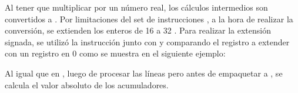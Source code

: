 \vspace{5mm}
\begin{center}
\end{center}

Al tener que multiplicar por un número real, los cálculos intermedios son convertidos a . Por limitaciones del set de instrucciones
, a la hora de realizar la conversión, se extienden los enteros de 16  a 32 . Para realizar la extensión signada,
se utilizó la instrucción  junto con  y  comparando el registro a extender con un registro en 0 como se 
muestra en el siguiente ejemplo:
\begin{center}
\end{center}
Al igual que en , luego de procesar las líneas pero antes de empaquetar a , se calcula el valor absoluto de 
los acumuladores.

